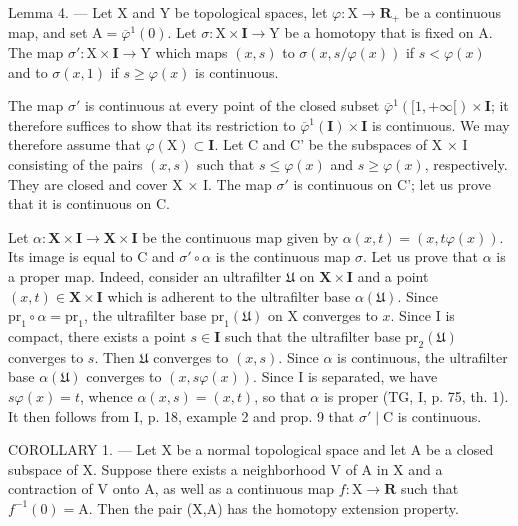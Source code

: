 Lemma 4. --- Let X and Y be topological spaces, let \(\varphi\colon\mathrm{X}\to\mathbf{R}_{+}\) be a continuous map, and set \(\mathrm{A}=\overline{\varphi}^{1}(0)\). Let \(\sigma\colon\mathrm{X}\times\mathbf{I}\to\mathrm{Y}\) be a homotopy that is fixed on A. The map \(\sigma'\colon\mathrm{X}\times\mathbf{I}\to\mathrm{Y}\) which maps \((x,s)\) to \(\sigma(x,s/\varphi(x))\) if \(s<\varphi(x)\) and to \(\sigma(x,1)\) if \(s\geqslant\varphi(x)\) is continuous.

The map \(\sigma'\) is continuous at every point of the closed subset \(\overline{\varphi}^{1}([1, +\infty[)\times\mathbf{I}\); it therefore suffices to show that its restriction to \(\overline{\varphi}^{1}(\mathbf{I})\times\mathbf{I}\) is continuous. We may therefore assume that \(\varphi(\mathrm{X})\subset\mathbf{I}\). Let C and C' be the subspaces of X × I consisting of the pairs \((x,s)\) such that \(s\leqslant\varphi(x)\) and \(s\geqslant\varphi(x)\), respectively. They are closed and cover X × I. The map \(\sigma'\) is continuous on C'; let us prove that it is continuous on C.

Let \(\alpha\colon\mathbf{X}\times\mathbf{I}\to\mathbf{X}\times\mathbf{I}\) be the continuous map given by \(\alpha(x,t)=(x,t\varphi(x))\). Its image is equal to C and \(\sigma'\circ\alpha\) is the continuous map \(\sigma\). Let us prove that \(\alpha\) is a proper map. Indeed, consider an ultrafilter \(\mathfrak{U}\) on \(\mathbf{X}\times\mathbf{I}\) and a point \((x,t)\in\mathbf{X}\times\mathbf{I}\) which is adherent to the ultrafilter base \(\alpha(\mathfrak{U})\). Since \(\mathrm{pr}_{1}\circ\alpha=\mathrm{pr}_{1}\), the ultrafilter base \(\mathrm{pr}_{1}(\mathfrak{U})\) on X converges to \(x\). Since I is compact, there exists a point \(s\in\mathbf{I}\) such that the ultrafilter base \(\mathrm{pr}_{2}(\mathfrak{U})\) converges to \(s\). Then \(\mathfrak{U}\) converges to \((x,s)\). Since \(\alpha\) is continuous, the ultrafilter base \(\alpha(\mathfrak{U})\) converges to \((x,s\varphi(x))\). Since I is separated, we have \(s\varphi(x)=t\), whence \(\alpha(x,s)=(x,t)\), so that \(\alpha\) is proper (TG, I, p. 75, th. 1). It then follows from I, p. 18, example 2 and prop. 9 that \(\sigma'\mid\mathrm{C}\) is continuous.

COROLLARY 1. --- Let X be a normal topological space and let A be a closed subspace of X. Suppose there exists a neighborhood V of A in X and a contraction of V onto A, as well as a continuous map \(f: \mathrm{X} \to \mathbf{R}\) such that \(f^{-1}(0) = \mathrm{A}\). Then the pair (X,A) has the homotopy extension property.

